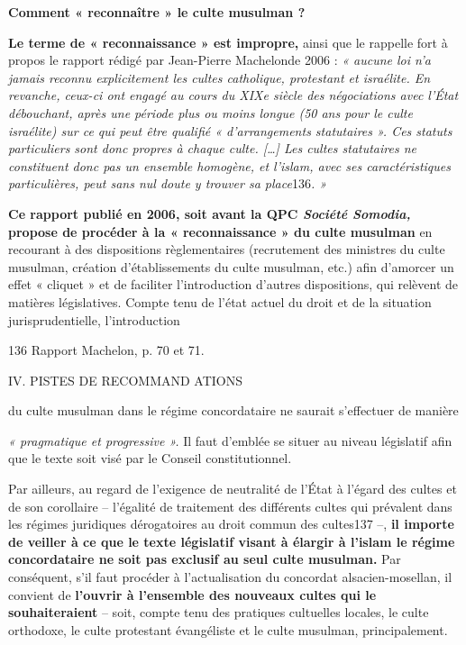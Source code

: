 \textbf{Comment « reconnaître » le culte musulman ?}

\textbf{Le terme de « reconnaissance » est impropre,} ainsi que le
rappelle fort à propos le rapport rédigé par Jean-Pierre Machelonde 2006
: \emph{« aucune loi n'a jamais reconnu explicitement les cultes
catholique, protestant et israélite. En revanche, ceux-ci ont engagé au
cours du XIXe siècle des négociations avec l'État débouchant, après une
période plus ou moins longue (50 ans pour le culte israélite) sur ce qui
peut être qualifié « d'arrangements statutaires ». Ces statuts
particuliers sont donc propres à chaque culte. {[}\ldots{]} Les cultes
statutaires ne constituent donc pas un ensemble homogène, et l'islam,
avec ses caractéristiques particulières, peut sans nul doute y trouver
sa place}136\emph{. »}

\textbf{Ce rapport publié en 2006, soit avant la QPC \emph{Société
Somodia,} propose de procéder à la « reconnaissance » du culte musulman}
en recourant à des dispositions règlementaires (recrutement des
ministres du culte musulman, création d'établissements du culte
musulman, etc.) afin d'amorcer un effet « cliquet » et de faciliter
l'introduction d'autres dispositions, qui relèvent de matières
législatives. Compte tenu de l'état actuel du droit et de la situation
jurisprudentielle, l'introduction

136 Rapport Machelon, p. 70 et 71.

IV. PISTES DE RECOMMAND ATIONS

du culte musulman dans le régime concordataire ne saurait s'effectuer de
manière

\emph{« pragmatique et progressive ».} Il faut d'emblée se situer au
niveau législatif afin que le texte soit visé par le Conseil
constitutionnel.

Par ailleurs, au regard de l'exigence de neutralité de l'État à l'égard
des cultes et de son corollaire -- l'égalité de traitement des
différents cultes qui prévalent dans les régimes juridiques dérogatoires
au droit commun des cultes137 --, \textbf{il importe de veiller à ce que
le texte législatif visant à élargir à l'islam le régime concordataire
ne soit pas exclusif au seul culte musulman.} Par conséquent, s'il faut
procéder à l'actualisation du concordat alsacien-mosellan, il convient
de \textbf{l'ouvrir à l'ensemble des nouveaux cultes qui le
souhaiteraient} -- soit, compte tenu des pratiques cultuelles locales,
le culte orthodoxe, le culte protestant évangéliste et le culte
musulman, principalement.

